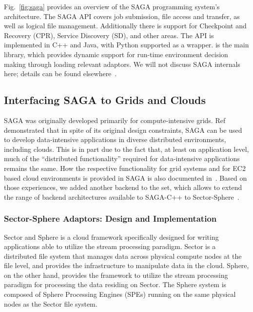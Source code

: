 \documentclass[3p,twocolumn]{elsarticle}
\begin{document}
Fig.~\ref{fig:saga} provides an overview of the SAGA programming
system's architecture.  The SAGA API covers job submission, file
access and transfer, as well as logical file management.  Additionally
there is support for Checkpoint and Recovery (CPR), Service Discovery
(SD), and other areas.  The API is implemented in C++ and Java, with
Python supported as a wrapper.  is the main library,
which provides dynamic support for run-time environment decision
making through loading relevant adaptors. We will not discuss SAGA
internals here; details can be found elsewhere~\cite{saga_url,Kaiser:2006qp}.


\subsection{Interfacing SAGA to Grids and Clouds}

SAGA was originally developed primarily for compute-intensive grids.
Ref~\cite{saga_ccgrid09} demonstrated that in spite of its original
design constraints, SAGA can be used to develop data-intensive
applications in diverse distributed environments, including clouds.
This is in part due to the fact that, at least on application level,
much of the ``distributed functionality'' required for data-intensive
applications remains the same.  How the respective functionality for
grid systems and for EC2 based cloud environments is provided in SAGA
is also documented in~\cite{saga_ccgrid09}.  Based on those
experiences, we added another backend to the set, which allows to
extend the range of backend architectures available to SAGA-C++ to
Sector-Sphere~\cite{sectorsphere09}.


\subsubsection{Sector-Sphere Adaptors: Design and Implementation}

Sector and Sphere is a cloud framework specifically designed for
writing applications able to utilize the stream processing paradigm.
Sector is a distributed file system that manages data across physical
compute nodes at the file level, and provides the infrastructure to
manipulate data in the cloud.  Sphere, on the other hand, provides the
framework to utilize the stream processing paradigm for processing the
data residing on Sector.  The Sphere system is composed of Sphere
Processing Engines (SPEs) running on the same physical nodes as the
Sector file system.
\end{document}
